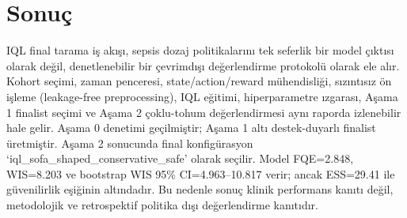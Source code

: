 \documentclass[conference]{IEEEtran}
\begin{document}
\section{Sonuç}
IQL final tarama iş akışı, sepsis dozaj politikalarını tek seferlik bir model çıktısı olarak değil, denetlenebilir bir çevrimdışı değerlendirme protokolü olarak ele alır. Kohort seçimi, zaman penceresi, state/action/reward mühendisliği, sızıntısız ön işleme (leakage-free preprocessing), IQL eğitimi, hiperparametre ızgarası, Aşama 1 finalist seçimi ve Aşama 2 çoklu-tohum değerlendirmesi aynı raporda izlenebilir hale gelir. Aşama 0 denetimi geçilmiştir; Aşama 1 altı destek-duyarlı finalist üretmiştir. Aşama 2 sonucunda final konfigürasyon `iql\_sofa\_shaped\_conservative\_safe' olarak seçilir. Model FQE=2.848, WIS=8.203 ve bootstrap WIS 95\% CI=4.963--10.817 verir; ancak ESS=29.41 ile güvenilirlik eşiğinin altındadır. Bu nedenle sonuç klinik performans kanıtı değil, metodolojik ve retrospektif politika dışı değerlendirme kanıtıdır.



\end{document}
